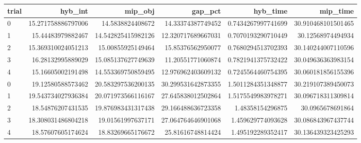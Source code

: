 \begin{tabular}{lrrrrr}
\hline
trial & hyb_int & mip_obj & gap_pct & hyb_time & mip_time \\ \hline
0 & 15.271758886797006 & 14.5838824408672 & 14.33374387749452 & 0.7434267997741699 & 30.910468101501465 \\
1 & 15.44483979882467 & 14.542825415982126 & 12.320717689667031 & 0.7070193290710449 & 30.12568974494934 \\
2 & 15.369310024051213 & 15.00855925149464 & 15.85376562950077 & 0.7680294513702393 & 30.140244007110596 \\
3 & 16.28132995889029 & 15.085137627749639 & 11.20551771060874 & 0.7821941375732422 & 30.049636363983154 \\
4 & 15.16605002191498 & 14.553369750859495 & 12.976962403609132 & 0.7245564460754395 & 30.060181856155396 \\
0 & 19.12580588573462 & 20.583297536200135 & 30.299531642873355 & 1.5011284351348877 & 30.219107389450073 \\
1 & 19.543734027936384 & 20.071973566116167 & 27.645838012502864 & 1.5175549983978271 & 30.096718311309814 \\
2 & 18.54876207431535 & 19.876983431317438 & 29.166488636723358 & 1.48358154296875 & 30.0965678691864 \\
3 & 18.308031486804218 & 19.01561997637171 & 27.064764646901068 & 1.459629774093628 & 30.086843967437744 \\
4 & 18.57607605174624 & 18.83269665176672 & 25.81616748814424 & 1.495192289352417 & 30.136439323425293 \\
\hline
\end{tabular}
